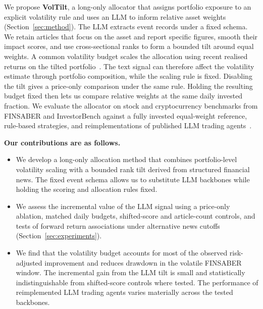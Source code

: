 We propose \textbf{VolTilt}, a long-only allocator that assigns portfolio exposure to an explicit volatility rule and uses an LLM to inform relative asset weights (Section~\ref{sec:method}). The LLM extracts event records under a fixed schema. We retain articles that focus on the asset and report specific figures, smooth their impact scores, and use cross-sectional ranks to form a bounded tilt around equal weights. A common volatility budget scales the allocation using recent realised returns on the tilted portfolio~\cite{moreira2017volmanaged,harvey2018impact}. The text signal can therefore affect the volatility estimate through portfolio composition, while the scaling rule is fixed. Disabling the tilt gives a price-only comparison under the same rule. Holding the resulting budget fixed then lets us compare relative weights at the same daily invested fraction. We evaluate the allocator on stock and cryptocurrency benchmarks from FINSABER and InvestorBench against a fully invested equal-weight reference, rule-based strategies, and reimplementations of published LLM trading agents~\cite{li2025finsaber,li2024investorbench}.

\noindent\textbf{Our contributions are as follows.}
\begin{itemize}
  \item We develop a long-only allocation method that combines portfolio-level volatility scaling with a bounded rank tilt derived from structured financial news. The fixed event schema allows us to substitute LLM backbones while holding the scoring and allocation rules fixed.
  \item We assess the incremental value of the LLM signal using a price-only ablation, matched daily budgets, shifted-score and article-count controls, and tests of forward return associations under alternative news cutoffs (Section~\ref{sec:experiments}).
  \item We find that the volatility budget accounts for most of the observed risk-adjusted improvement and reduces drawdown in the volatile FINSABER window. The incremental gain from the LLM tilt is small and statistically indistinguishable from shifted-score controls where tested. The performance of reimplemented LLM trading agents varies materially across the tested backbones.
\end{itemize}
